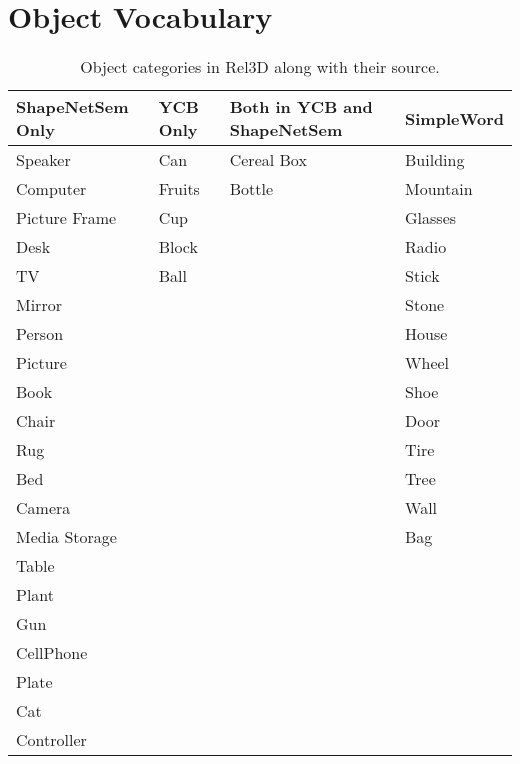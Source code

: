\documentclass{article}
\begin{document}
\section{Object Vocabulary}
\begin{longtable}{|l|l|l|l|}
\caption{Object categories in Rel3D along with their source.} \\
\hline
ShapeNetSem Only & YCB Only & Both in YCB and ShapeNetSem & SimpleWord \\ \hline \hline
Speaker       & Can      & Cereal Box     & Building   \\ \hline
Computer      & Fruits   & Bottle         & Mountain   \\ \hline
Picture Frame & Cup      &                & Glasses    \\ \hline
Desk          & Block    &                & Radio      \\ \hline
TV            & Ball     &                & Stick      \\ \hline
Mirror        &          &                & Stone      \\ \hline
Person        &          &                & House      \\ \hline
Picture       &          &                & Wheel      \\ \hline
Book          &          &                & Shoe       \\ \hline
Chair         &          &                & Door       \\ \hline
Rug           &          &                & Tire       \\ \hline
Bed           &          &                & Tree       \\ \hline
Camera        &          &                & Wall       \\ \hline
Media Storage &          &                & Bag        \\ \hline
Table         &          &                &            \\ \hline
Plant         &          &                &            \\ \hline
Gun           &          &                &            \\ \hline
CellPhone     &          &                &            \\ \hline
Plate         &          &                &            \\ \hline
Cat           &          &                &            \\ \hline
Controller    &          &                &            \\ \hline

\end{longtable}
\end{document}
